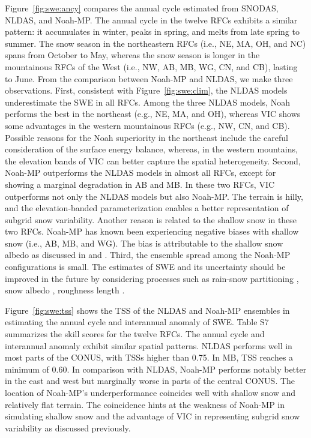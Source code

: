 \documentclass[essd, manuscript]{copernicus}
\begin{document}
Figure~\ref{fig:swe:ancy} compares the annual cycle estimated from SNODAS, NLDAS, and Noah-MP\@. The annual cycle in the twelve RFCs exhibits a similar pattern: it accumulates in winter, peaks in spring, and melts from late spring to summer. The snow season in the northeastern RFCs (i.e., NE, MA, OH, and NC) spans from October to May, whereas the snow season is longer in the mountainous RFCs of the West (i.e., NW, AB, MB, WG, CN, and CB), lasting to June. From the comparison between Noah-MP and NLDAS, we make three observations. First, consistent with Figure~\ref{fig:swe:clim}, the NLDAS models underestimate the SWE in all RFCs. Among the three NLDAS models, Noah performs the best in the northeast (e.g., NE, MA, and OH), whereas VIC shows some advantages in the western mountainous RFCs (e.g., NW, CN, and CB). Possible reasons for the Noah superiority in the northeast include the careful consideration of the surface energy balance, whereas, in the western mountains, the elevation bands of VIC can better capture the spatial heterogeneity. Second, Noah-MP outperforms the NLDAS models in almost all RFCs, except for showing a marginal degradation in AB and MB\@. In these two RFCs, VIC outperforms not only the NLDAS models but also Noah-MP\@. The terrain is hilly, and the elevation-banded parameterization enables a better representation of subgrid snow variability. Another reason is related to the shallow snow in these two RFCs. Noah-MP has known been experiencing negative biases with shallow snow (i.e., AB, MB, and WG). The bias is attributable to the shallow snow albedo as discussed in \citet{dang2019TC} and \citet{wang2020JHd}. Third, the ensemble spread among the Noah-MP configurations is small. The estimates of SWE and its uncertainty should be improved in the future by considering processes such as rain-snow partitioning \citet{wang2019GRL}, snow albedo \citep{wang2020JHd, dang2019TC}, roughness length \citep{he2019JGRA}.

Figure~\ref{fig:swe:tss} shows the TSS of the NLDAS and Noah-MP ensembles in estimating the annual cycle and interannual anomaly of SWE\@. Table S7 summarizes the skill scores for the twelve RFCs. The annual cycle and interannual anomaly exhibit similar spatial patterns. NLDAS performs well in most parts of the CONUS, with TSSs higher than 0.75. In MB, TSS reaches a minimum of 0.60. In comparison with NLDAS, Noah-MP performs notably better in the east and west but marginally worse in parts of the central CONUS\@. The location of Noah-MP's underperformance coincides well with shallow snow and relatively flat terrain. The coincidence hints at the weakness of Noah-MP in simulating shallow snow and the advantage of VIC in representing subgrid snow variability as discussed previously.
\end{document}
